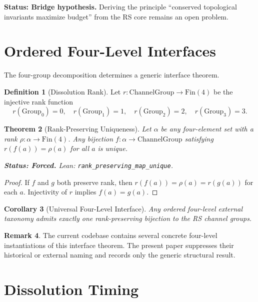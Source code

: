 \documentclass[11pt,a4paper]{article}
\newtheorem{theorem}{Theorem}[section]
\newtheorem{corollary}[theorem]{Corollary}
\theoremstyle{definition}
\newtheorem{definition}[theorem]{Definition}
\newtheorem{remark}[theorem]{Remark}
\newcommand{\code}[1]{\texttt{\small #1}}
\newcommand{\forced}[1]{\noindent\textbf{Status: Forced.} #1}
\newcommand{\bridge}[1]{\noindent\textbf{Status: Bridge hypothesis.} #1}
\begin{document}
\bridge{Deriving the principle ``conserved topological invariants
maximize budget'' from the RS core remains an open problem.}

\section{Ordered Four-Level Interfaces}
\label{sec:convergence}

The four-group decomposition determines a generic interface theorem.

\begin{definition}[Dissolution Rank]
\label{def:rank}
Let $r: \mathrm{ChannelGroup} \to \mathrm{Fin}(4)$ be the injective
rank function
\[
  r(\mathrm{Group}_0)=0,\quad
  r(\mathrm{Group}_1)=1,\quad
  r(\mathrm{Group}_2)=2,\quad
  r(\mathrm{Group}_3)=3.
\]
\end{definition}

\begin{theorem}[Rank-Preserving Uniqueness]
\label{thm:unique-map}
Let $\alpha$ be any four-element set with a rank
$\rho: \alpha \to \mathrm{Fin}(4)$.
Any bijection $f: \alpha \to \mathrm{ChannelGroup}$ satisfying
$r(f(a)) = \rho(a)$ for all $a$ is unique.

\forced{Lean: \code{rank\_preserving\_map\_unique}.}
\end{theorem}

\begin{proof}
If $f$ and $g$ both preserve rank, then
$r(f(a))=\rho(a)=r(g(a))$ for each $a$.
Injectivity of $r$ implies $f(a)=g(a)$.
\end{proof}

\begin{corollary}[Universal Four-Level Interface]
\label{cor:forced-maps}
Any ordered four-level external taxonomy admits exactly one
rank-preserving bijection to the RS channel groups.
\end{corollary}

\begin{remark}
The current codebase contains several concrete four-level instantiations
of this interface theorem. The present paper suppresses their historical
or external naming and records only the generic structural result.
\end{remark}

\section{Dissolution Timing}
\label{sec:timing}
\end{document}
